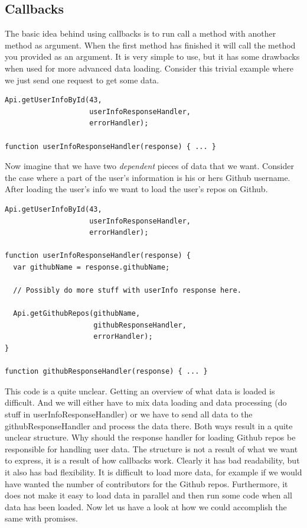 \documentclass[a4paper,12pt]{article}
\begin{document}
\subsection{Callbacks}
The basic idea behind using callbacks is to run call a method with another method as argument. When the first method has finished it will call the method you provided as an argument.
It is very simple to use, but it has some drawbacks when used for more advanced data loading. Consider this trivial example where we just send one request to get some data.

\begin{lstlisting}[caption=Code showing how we can load data using callbacks, frame=single]
Api.getUserInfoById(43, 
                    userInfoResponseHandler, 
                    errorHandler);

function userInfoResponseHandler(response) { ... }
\end{lstlisting}
Now imagine that we have two \emph{dependent} pieces of data that we want. Consider the case where a part of the user's information is
his or hers Github username. After loading the user's info we want to load the user's repos on Github.

\begin{lstlisting}[caption={Code, using callbacks, showing how we can load two pieces of data, where the second is dependent on the first}, frame=single]
Api.getUserInfoById(43, 
                    userInfoResponseHandler, 
                    errorHandler);

function userInfoResponseHandler(response) {
  var githubName = response.githubName;

  // Possibly do more stuff with userInfo response here.

  Api.getGithubRepos(githubName, 
                     githubResponseHandler, 
                     errorHandler);
}

function githubResponseHandler(response) { ... }
\end{lstlisting}
This code is a quite unclear. Getting an overview of what data is loaded is difficult. And we will either have to mix data loading and data processing (do stuff in userInfoResponseHandler) or we
have to send all data to the githubResponseHandler and process the data there. Both ways result in a quite unclear structure. Why should the response handler for loading Github repos be responsible for handling user data. The structure is not a result of what we want to express, it is a result of how callbacks work. Clearly it has bad readability, but it also has bad flexibility. It is difficult to load more data, for example if we would have wanted the number of contributors for the Github repos. Furthermore, it does not make it easy to load data in parallel and then run some code when all data has been loaded. Now let us have a look at how we could accomplish the same with promises.
\end{document}
